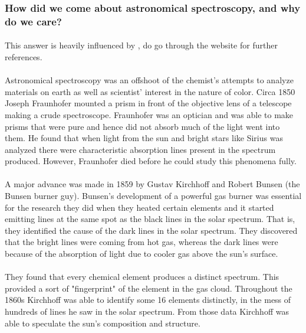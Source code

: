 \documentclass[a4paper,twoside]{article}
\numberwithin{equation}{section}
\begin{document}
\subsubsection{How did we come about astronomical spectroscopy, and why do we care?}
\paragraph{}
This answer is heavily influenced by \cite{ASHistory}, do go through the website for further references. 
\paragraph{}
Astronomical spectroscopy was an offshoot of the chemist's attempts to analyze materials on earth as well as scientist' interest in the nature of color. Circa 1850 Joseph Fraunhofer mounted a prism in front of the objective lens of a telescope making a crude spectroscope. Fraunhofer was an optician and was able to make prisms that were pure and hence did not absorb much of the light went into them. He found that when light from the sun and bright stars like Sirius was analyzed there were characteristic absorption lines present in the spectrum produced. However, Fraunhofer died before he could study this phenomena fully. 
\paragraph{}
A major advance was made in 1859 by Gustav Kirchhoff and Robert Bunsen (the Bunsen burner guy). Bunsen's development of a powerful gas burner was essential for the research they did when they heated certain elements and it started emitting lines at the same spot as the black lines in the solar spectrum. That is, they identified the cause of the dark lines in the solar spectrum. They discovered that the bright lines were coming from hot gas, whereas the dark lines were because of the absorption of light due to cooler gas above the sun's surface. 
\paragraph{}
They found that every chemical element produces a distinct spectrum. This provided a sort of "fingerprint" of the element in the gas cloud. Throughout the 1860s Kirchhoff was able to identify some 16 elements distinctly, in the mess of hundreds of lines he saw in the solar spectrum. From those data Kirchhoff was able to speculate the sun's composition and structure. 
\end{document}
